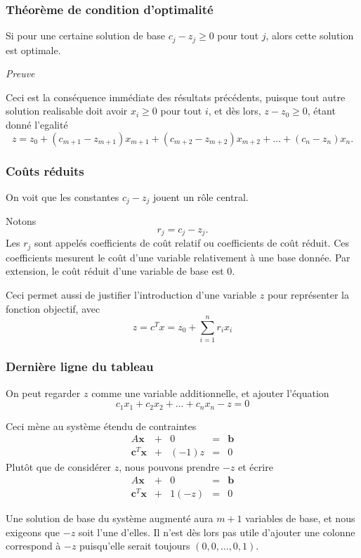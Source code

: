 \documentclass[t,usepdftitle=false]{beamer}
\def\bb{\boldsymbol{b}}
\def\bc{\boldsymbol{c}}
\def\bx{\boldsymbol{x}}
\begin{document}
\begin{frame}
\frametitle{Théorème de condition d'optimalité}

Si pour une certaine solution de base $c_j - z_j \geq 0$ pour tout $j$, alors cette solution est optimale.

\mbox{}

\textit{Preuve}

Ceci est la conséquence immédiate des résultats précédents, puisque tout autre solution realisable doit avoir $x_i \geq 0$ pour tout $i$, et dès lors, $z - z_0 \geq 0$, étant donné l'egalité
\[
z = z_0 + (c_{m+1} - z_{m+1})x_{m+1}
+ (c_{m+2} - z_{m+2})x_{m+2} + \ldots
+ (c_{n} - z_n) x_{n}.
\]
\end{frame}

\begin{frame}
\frametitle{Coûts réduits}

On voit que les constantes $c_j - z_j$ jouent un rôle central.

\mbox{}

Notons
\[
r_j = c_j - z_j.
\] 
Les $r_j$ sont appelés coefficients de {\color{blue}coût relatif} ou coefficients de {\color{blue}coût réduit}. Ces coefficients mesurent le coût d'une variable relativement à une base donnée. Par extension, le coût réduit d'une variable de base est 0.

\mbox{}

Ceci permet aussi de justifier l'introduction d'une variable $z$ pour représenter la fonction objectif, avec
$$
z = c^Tx = z_0 + \sum_{i = 1}^n r_i x_i
$$

\end{frame}

\begin{frame}
	\frametitle{Dernière ligne du tableau}
	
	On peut regarder $z$ comme une variable additionnelle, et ajouter l'équation
	\[
	c_1x_1 + c_2x_2 + \ldots + c_nx_n - z = 0
	\]
	

Ceci mène au %
système étendu de contraintes
$$
\begin{matrix}
	A\bx & + & 0 & = & \bb \\
	\bc^T \bx & + & (-1)z & = &  0 
\end{matrix}
$$
Plutôt que de considérer $z$, nous pouvons prendre $-z$ et écrire
$$
\begin{matrix}
	A\bx & + & 0 & = & \bb \\
	\bc^T \bx & + & 1(-z) & = &  0
\end{matrix}
$$

Une solution de base du système augmenté aura $m+1$ variables de base, et nous exigeons que $-z$ soit l'une d'elles.
Il n'est dès lors pas utile d'ajouter une colonne correspond à $-z$ puisqu'elle serait toujours $(0, 0, \ldots, 0, 1)$.

\end{frame}
\end{document}
